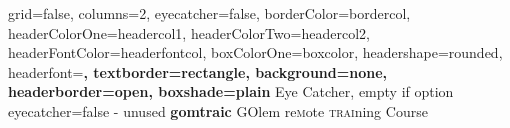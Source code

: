 \documentclass[a4paper,portrait,fontscale=1]{baposter}
\begin{document}


\begin{poster}{
	grid=false,
        columns=2,
	eyecatcher=false, 
	borderColor=bordercol,
	headerColorOne=headercol1,
	headerColorTwo=headercol2,
	headerFontColor=headerfontcol,
	boxColorOne=boxcolor,
	headershape=rounded,
	headerfont=\Large\sf\bf,
	textborder=rectangle,
	background=none,
	headerborder=open,
  boxshade=plain
}
{
	Eye Catcher, empty if option eyecatcher=false - unused
}
{\sf\bf
	gomtraic
}
{
  \textsc{GO}lem re\textsc{m}ote \textsc{trai}ning \textsc{C}ourse
}
{
}

\end{poster}
\end{document}
